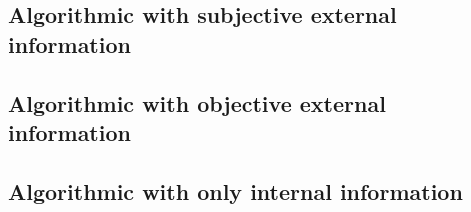 \subsection{Algorithmic with subjective external information}

\subsection{Algorithmic with objective external information}

\subsection{Algorithmic with only internal information}



